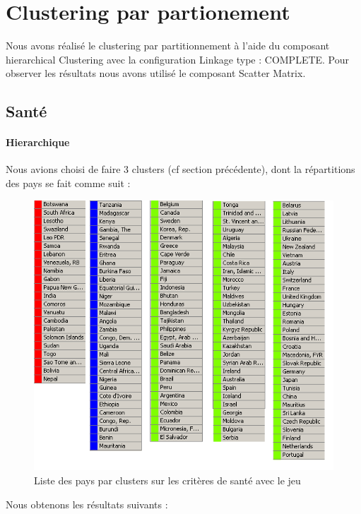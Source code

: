 \section{Clustering par partionement}
Nous avons réalisé le clustering par partitionnement à l'aide du composant hierarchical Clustering avec la configuration Linkage type : COMPLETE. Pour observer les résultats nous avons utilisé le composant Scatter Matrix.

\subsection{Santé}

\paragraph{Hierarchique}
Nous avions choisi de faire 3 clusters (cf section précédente), dont la répartitions des pays se fait comme suit : 

\begin{figure}[H]
	\begin{center}
		\includegraphics[scale=0.5]{Image/TableViewSanteNoMissing2}
		\caption{Liste des pays par clusters sur les critères de santé avec le jeu \jeuc}
	\end{center}
\end{figure}


Nous obtenons les résultats suivants : 

